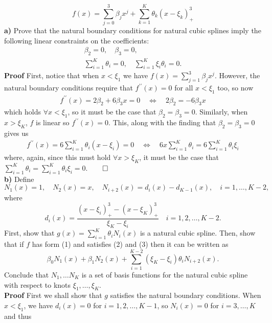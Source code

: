 \documentclass[10pt]{article}
\newcommand{\1}[1]{\mathbbm{1}_{#1}}
\begin{document}
    \[f(x)=\sum_{j=0}^3\beta_jx^j+\sum_{k=1}^K\theta_k(x-\xi_k)^3_+\tag{1}\]
    {\bf a)}\hspace{5pt} Prove that the natural boundary conditions for natural cubic splines imply the following linear constraints on the coefficients:
    \begin{align*}
        \beta_2=0,\quad\beta_3=0,\tag{2}\\
        \sum_{i=1}^K\theta_i=0,\quad\sum_{i=1}^K\xi_i\theta_i=0\tag{3}.
    \end{align*}
    {\bf Proof}\hspace{5pt} First, notice that when $x<\xi_1$ we have $f(x)=\sum_{j=1}^3\beta_jx^j$. However, the natural boundary conditions require that $f^{\prime\prime}(x)=0$ for all $x<\xi_1$ too, so now
    \begin{align*}
        f^{\prime\prime}(x)=2\beta_2+6\beta_3x=0\quad\Leftrightarrow\quad 2\beta_2=-6\beta_3x
    \end{align*}
    which holds $\forall x<\xi_1$, so it must be the case that $\beta_2=\beta_3=0$. Similarly, when $x>\xi_K$, $f$ is linear so $f^{\prime\prime}(x)=0$. This, along with the finding that $\beta_2=\beta_3=0$ gives us
    \begin{align*}
        f^{\prime\prime}(x)=6\sum_{i=1}^K\theta_i(x-\xi_i)=0\quad\Leftrightarrow\quad 6x\sum_{i=1}^K\theta_i=6\sum_{i=1}^K\theta_i\xi_i
    \end{align*}
    where, again, since this must hold $\forall x>\xi_K$, it must be the case that $\sum_{i=1}^K\theta_i=\sum_{i=1}^K\theta_i\xi_i=0$.\hfill{$\qed$}\\[5pt]
    {\bf b)}\hspace{5pt} Define 
    \[N_1(x)=1,\quad N_2(x)=x,\quad N_{i+2}(x)=d_i(x)-d_{K-1}(x),\quad i=1,\dots,K-2,\]
    where 
    \[d_i(x)=\frac{(x-\xi_i)^3_+-(x-\xi_K)^3_+}{\xi_K-\xi_i}\quad i=1,2,\dots, K-2.\]
    First, show that $g(x)=\sum_{i=1}^K\theta_iN_i(x)$ is a natural cubic spline. Then, show that if $f$ has form (1) and satisfies (2) and (3) then it can be written as
    \[\beta_0N_1(x)+\beta_1N_2(x)+\sum_{i=1}^{K-2}(\xi_K-\xi_i)\theta_iN_{i+2}(x).\tag{4}\]
    Conclude that $N_1,\dots N_K$ is a set of basis functions for the natural cubic spline with respect to knots $\xi_1,\dots,\xi_K$. \\[5pt]
    {\bf Proof}\hspace{5pt} First we shall show that $g$ satisfies the natural boundary conditions. When $x<\xi_1$, we have $d_i(x)=0$ for $i=1,2,\dots,K-1$, so $N_i(x)=0$ for $i=3,\dots,K$ and thus
\end{document}
